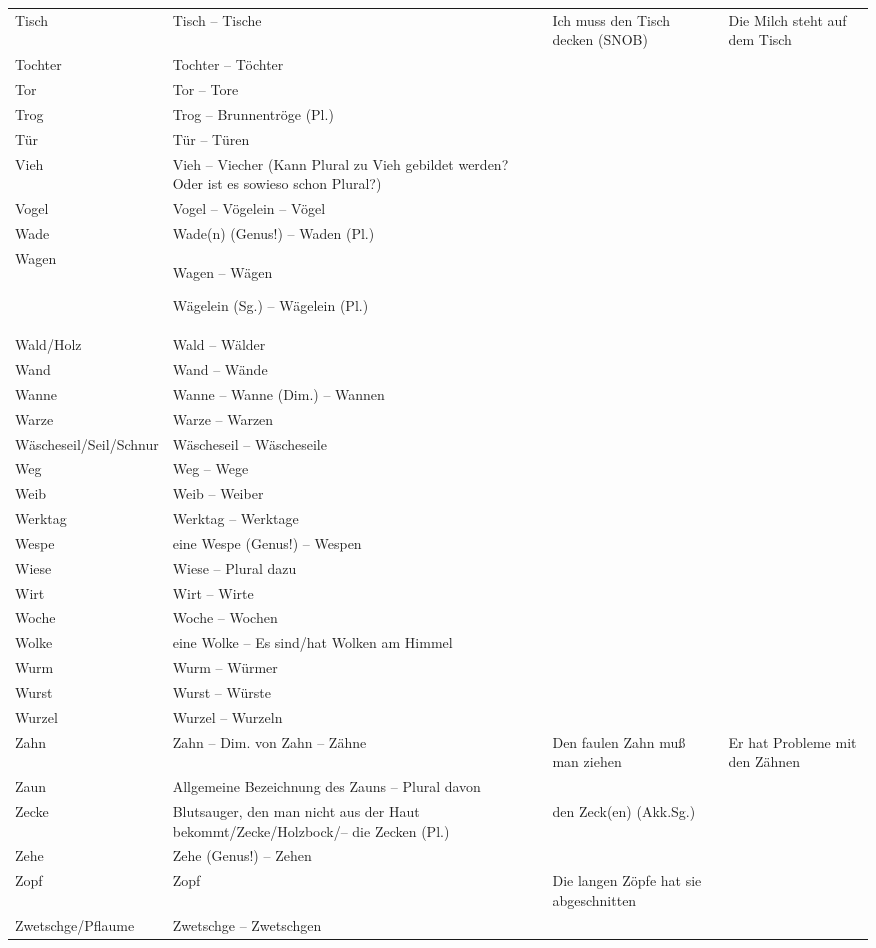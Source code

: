 {\begin{xltabular}{\textwidth}{>{\raggedright\arraybackslash}p{.15\textwidth}QQQ}
Tisch & Tisch -- Tische & Ich muss den Tisch decken (SNOB) & Die Milch steht auf dem Tisch\\
Tochter & Tochter -- Töchter &  & \\
Tor & Tor -- Tore &  & \\
Trog & Trog -- Brunnentröge (Pl.) &  & \\
Tür & Tür -- Türen &  & \\
Vieh & Vieh -- Viecher (Kann Plural zu Vieh gebildet werden? Oder ist es sowieso schon Plural?) &  & \\
Vogel & Vogel -- Vögelein -- Vögel &  & \\
Wade & Wade(n) (Genus!) -- Waden (Pl.) &  & \\
Wagen & Wagen -- Wägen

Wägelein (Sg.) -- Wägelein (Pl.) &  & \\
Wald\slash Holz & Wald -- Wälder &  & \\
Wand & Wand -- Wände &  & \\
Wanne & Wanne -- Wanne (Dim.) -- Wannen &  & \\
Warze & Warze -- Warzen &  & \\
Wäscheseil\slash Seil\slash Schnur & Wäscheseil -- Wäscheseile &  & \\
Weg & Weg -- Wege &  & \\
Weib & Weib -- Weiber &  & \\
Werktag & Werktag -- Werktage &  & \\
Wespe & eine Wespe (Genus!) -- Wespen &  & \\
Wiese & Wiese -- Plural dazu &  & \\
Wirt & Wirt -- Wirte &  & \\
Woche & Woche -- Wochen &  & \\
Wolke & eine Wolke -- Es sind/hat Wolken am Himmel &  & \\
Wurm & Wurm -- Würmer &  & \\
Wurst & Wurst -- Würste &  & \\
Wurzel & Wurzel -- Wurzeln &  & \\
Zahn & Zahn -- Dim. von Zahn -- Zähne & Den faulen Zahn muß man ziehen & Er hat Probleme mit den Zähnen\\
Zaun & Allgemeine Bezeichnung des Zauns -- Plural davon &  & \\
Zecke & Blutsauger, den man nicht aus der Haut bekommt\slash Zecke\slash Holzbock\slash -- die Zecken (Pl.) & den Zeck(en) (Akk.Sg.) & \\
Zehe & Zehe (Genus!) -- Zehen &  & \\
Zopf & Zopf & Die langen Zöpfe hat sie abgeschnitten & \\
Zwetschge\slash Pflaume & Zwetschge -- Zwetschgen &  & \\
\end{xltabular}}

